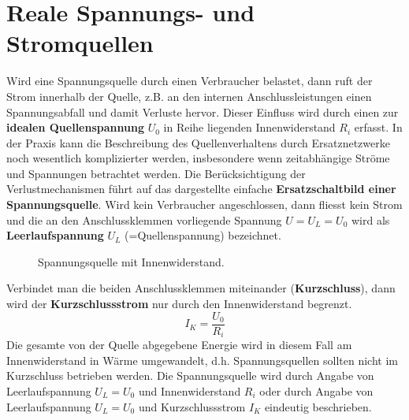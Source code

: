 \section{Reale Spannungs- und Stromquellen}
Wird eine Spannungsquelle durch einen Verbraucher belastet, dann ruft der Strom innerhalb der Quelle, z.B. an den internen Anschlussleistungen einen Spannungsabfall und damit Verluste hervor. Dieser Einfluss wird durch einen zur \textbf{idealen Quellenspannung} $U_0$ in Reihe liegenden Innenwiderstand $R_i$ erfasst. In der Praxis kann die Beschreibung des Quellenverhaltens durch Ersatznetzwerke noch wesentlich komplizierter werden, insbesondere wenn zeitabhängige Ströme und Spannungen betrachtet werden.
\newline\newline
Die Berücksichtigung der Verlustmechanismen führt auf das dargestellte einfache \textbf{Ersatzschaltbild einer Spannungsquelle}. Wird kein Verbraucher angeschlossen, dann fliesst kein Strom und die an den Anschlussklemmen vorliegende Spannung $U=U_L=U_0$ wird als \textbf{Leerlaufspannung} $U_L$ (=Quellenspannung) bezeichnet.
\begin{figure}[H]
\centering
\caption{Spannungsquelle mit Innenwiderstand.}
\label{fig_IIIv}
\end{figure}
\noindent Verbindet man die beiden Anschlussklemmen miteinander (\textbf{Kurzschluss}), dann wird der \textbf{Kurzschlussstrom} nur durch den Innenwiderstand begrenzt. 
\begin{equation}
\boxed{I_K=\dfrac{U_0}{R_i}}
\end{equation}
\noindent Die gesamte von der Quelle abgegebene Energie wird in diesem Fall am Innenwiderstand in Wärme umgewandelt, d.h. Spannungsquellen sollten nicht im Kurzschluss betrieben werden. Die Spannungsquelle wird durch Angabe von Leerlaufspannung $U_L=U_0$ und Innenwiderstand $R_i$ oder durch Angabe von Leerlaufspannung $U_L=U_0$ und Kurzschlussstrom $I_K$ eindeutig beschrieben.
